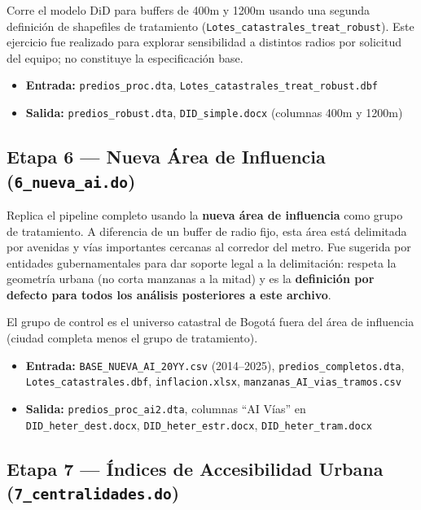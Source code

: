 \documentclass[12pt, a4paper]{article}
\begin{document}
Corre el modelo DiD para buffers de 400m y 1200m usando una segunda definición de shapefiles de tratamiento (\texttt{Lotes\_catastrales\_treat\_robust}). Este ejercicio fue realizado para explorar sensibilidad a distintos radios por solicitud del equipo; no constituye la especificación base.

\begin{itemize}
  \item \textbf{Entrada:} \texttt{predios\_proc.dta}, \texttt{Lotes\_catastrales\_treat\_robust.dbf}
  \item \textbf{Salida:} \texttt{predios\_robust.dta}, \texttt{DID\_simple.docx} (columnas 400m y 1200m)
\end{itemize}

\subsection{Etapa 6 — Nueva Área de Influencia (\texttt{6\_nueva\_ai.do})}

Replica el pipeline completo usando la \textbf{nueva área de influencia} como grupo de tratamiento. A diferencia de un buffer de radio fijo, esta área está delimitada por avenidas y vías importantes cercanas al corredor del metro. Fue sugerida por entidades gubernamentales para dar soporte legal a la delimitación: respeta la geometría urbana (no corta manzanas a la mitad) y es la \textbf{definición por defecto para todos los análisis posteriores a este archivo}.

El grupo de control es el universo catastral de Bogotá fuera del área de influencia (ciudad completa menos el grupo de tratamiento).

\begin{itemize}
  \item \textbf{Entrada:} \texttt{BASE\_NUEVA\_AI\_20YY.csv} (2014–2025), \texttt{predios\_completos.dta}, \texttt{Lotes\_catastrales.dbf}, \texttt{inflacion.xlsx}, \texttt{manzanas\_AI\_vias\_tramos.csv}
  \item \textbf{Salida:} \texttt{predios\_proc\_ai2.dta}, columnas ``AI Vías'' en \texttt{DID\_heter\_dest.docx}, \texttt{DID\_heter\_estr.docx}, \texttt{DID\_heter\_tram.docx}
\end{itemize}

\subsection{Etapa 7 — Índices de Accesibilidad Urbana (\texttt{7\_centralidades.do})}
\end{document}

